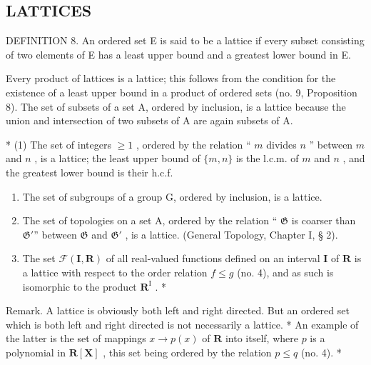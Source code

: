 \subsection{LATTICES}

DEFINITION 8. An ordered set E is said to be a lattice if every subset consisting of two elements of E has a least upper bound and a greatest lower bound in E.

Every product of lattices is a lattice; this follows from the condition for the existence of a least upper bound in a product of ordered sets (no. 9, Proposition 8). The set of subsets of a set A, ordered by inclusion, is a lattice because the union and intersection of two subsets of A are again subsets of A.


* (1) The set of integers \(\geqslant 1\) , ordered by the relation `` \(m\) divides \(n\) '' between \(m\) and \(n\) , is a lattice; the least upper bound of \(\{m, n\}\) is the l.c.m. of \(m\) and \(n\) , and the greatest lower bound is their h.c.f.

\begin{enumerate}
\def\labelenumi{(\arabic{enumi})}
\setcounter{enumi}{1}
\item
  The set of subgroups of a group G, ordered by inclusion, is a lattice.
\item
  The set of topologies on a set A, ordered by the relation `` \(\mathfrak{G}\) is coarser than \(\mathfrak{G}'\)'' between \(\mathfrak{G}\) and \(\mathfrak{G}'\) , is a lattice. (General Topology, Chapter I, § 2).
\item
  The set \(\mathcal{F}(\mathbf{I},\mathbf{R})\) of all real-valued functions defined on an interval \(\mathbf{I}\) of \(\mathbf{R}\) is a lattice with respect to the order relation \(f\leqslant g\) (no. 4), and as such is isomorphic to the product \(\mathbf{R}^{\mathrm{I}}\) . *
\end{enumerate}

Remark. A lattice is obviously both left and right directed. But an ordered set which is both left and right directed is not necessarily a lattice. * An example of the latter is the set of mappings \(x \to p(x)\) of \(\mathbf{R}\) into itself, where \(p\) is a polynomial in \(\mathbf{R}[\mathbf{X}]\) , this set being ordered by the relation \(p \leqslant q\) (no. 4). *

